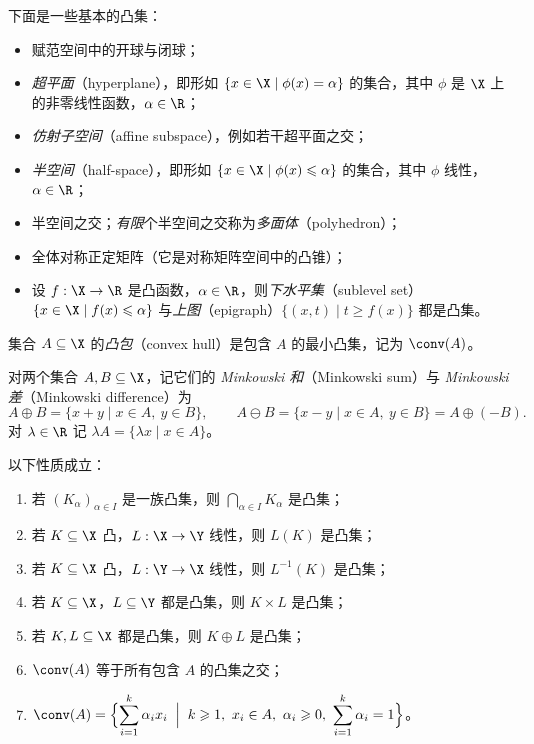 \begin{example}
\label{exa:1}
下面是一些基本的凸集：
\begin{itemize}[itemsep=1pt]
  \item 赋范空间中的开球与闭球；
  \item \emph{超平面}（hyperplane），即形如 $\{x\in\X\mid\phi(x)=\alpha\}$ 的集合，其中 $\phi$ 是 $\X$ 上的非零线性函数，$\alpha\in\R$；
  \item \emph{仿射子空间}（affine subspace），例如若干超平面之交；
  \item \emph{半空间}（half-space），即形如 $\{x\in\X\mid\phi(x)\leqslant\alpha\}$ 的集合，其中 $\phi$ 线性，$\alpha\in\R$；
  \item 半空间之交；\emph{有限}个半空间之交称为\emph{多面体}（polyhedron）；
  \item 全体对称正定矩阵（它是对称矩阵空间中的凸锥）；
  \item 设 $f:\X\to\R$ 是凸函数，$\alpha\in\R$，则\emph{下水平集}（sublevel set）$\{x\in\X\mid f(x)\leqslant\alpha\}$
        与\emph{上图}（epigraph）$\{(x,t)\mid t\geqslant f(x)\}$ 都是凸集。
\end{itemize}
\end{example}

\begin{definition}[凸包]
\label{def:3}
集合 $A\subseteq\X$ 的\emph{凸包}（convex hull）是包含 $A$ 的最小凸集，记为 $\conv(A)$。
\end{definition}

对两个集合 $A,B\subseteq\X$，记它们的 \emph{Minkowski 和}（Minkowski sum）与 \emph{Minkowski 差}（Minkowski difference）为
\[
  A\oplus B=\{x+y\mid x\in A,\ y\in B\},\qquad
  A\ominus B=\{x-y\mid x\in A,\ y\in B\}=A\oplus(-B).
\]
对 $\lambda\in\R$ 记 $\lambda A=\{\lambda x\mid x\in A\}$。

\begin{proposition}
\label{res:1}
以下性质成立：
\begin{enumerate}[label=(\roman*)]
  \item 若 $(K_\alpha)_{\alpha\in I}$ 是一族凸集，则 $\bigcap_{\alpha\in I}K_\alpha$ 是凸集；
  \item 若 $K\subseteq\X$ 凸，$L:\X\to\Y$ 线性，则 $L(K)$ 是凸集；
  \item 若 $K\subseteq\X$ 凸，$L:\Y\to\X$ 线性，则 $L^{-1}(K)$ 是凸集；
  \item 若 $K\subseteq\X$，$L\subseteq\Y$ 都是凸集，则 $K\times L$ 是凸集；
  \item 若 $K,L\subseteq\X$ 都是凸集，则 $K\oplus L$ 是凸集；
  \item $\conv(A)$ 等于所有包含 $A$ 的凸集之交；
  \item $\displaystyle\conv(A)=\Bigl\{\sum_{i=1}^k\alpha_ix_i \;\Bigm|\; k\geqslant1,\ x_i\in A,\ \alpha_i\geqslant0,\ \sum_{i=1}^k\alpha_i=1\Bigr\}$。
\end{enumerate}
\end{proposition}

